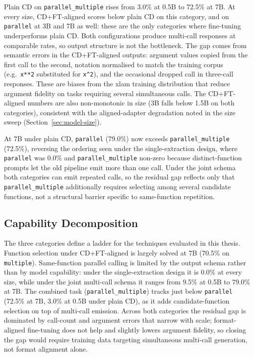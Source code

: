 Plain CD on \texttt{parallel\_multiple} rises from 3.0\% at 0.5B to 72.5\%
at 7B. At every size, CD+FT-aligned scores below plain CD on this category,
and on \texttt{parallel} at 3B and 7B as well: these are the only categories
where fine-tuning underperforms plain CD. Both configurations produce
multi-call responses at comparable rates, so output structure is not the
bottleneck. The gap comes from semantic errors in the CD+FT-aligned outputs:
argument values copied from the first call to the second, notation normalised
to match the training corpus (e.g.\ \texttt{x**2} substituted for
\texttt{x\textasciicircum{}2}), and the occasional dropped call in three-call
responses. These are biases from the xlam training distribution that reduce
argument fidelity on tasks requiring several simultaneous calls. The
CD+FT-aligned numbers are also non-monotonic in size (3B falls below 1.5B on
both categories), consistent with the aligned-adapter degradation noted in
the size sweep (Section~\ref{sec:model-size}).

At 7B under plain CD, \texttt{parallel} (79.0\%) now exceeds
\texttt{parallel\_multiple} (72.5\%), reversing the ordering seen under the
single-extraction design, where \texttt{parallel} was 0.0\% and
\texttt{parallel\_multiple} non-zero because distinct-function prompts let the
old pipeline emit more than one call. Under the joint schema both categories
can emit repeated calls, so the residual gap reflects only that
\texttt{parallel\_multiple} additionally requires selecting among several
candidate functions, not a structural barrier specific to same-function
repetition.

\subsection{Capability Decomposition}

The three categories define a ladder for the techniques evaluated in this
thesis. Function selection under CD+FT-aligned is largely solved at 7B
(70.5\% on \texttt{multiple}). Same-function parallel calling is limited by
the output schema rather than by model capability: under the single-extraction
design it is 0.0\% at every size, while under the joint multi-call schema it
ranges from 9.5\% at 0.5B to 79.0\% at 7B. The combined
task (\texttt{parallel\_multiple}) tracks just below \texttt{parallel}
(72.5\% at 7B, 3.0\% at 0.5B under plain CD), as it adds candidate-function
selection on top of multi-call emission. Across both categories the residual
gap is dominated by call-count and argument errors that narrow with scale;
format-aligned fine-tuning does not help and slightly lowers argument
fidelity, so closing the gap would require training data targeting
simultaneous multi-call generation, not format alignment alone.

